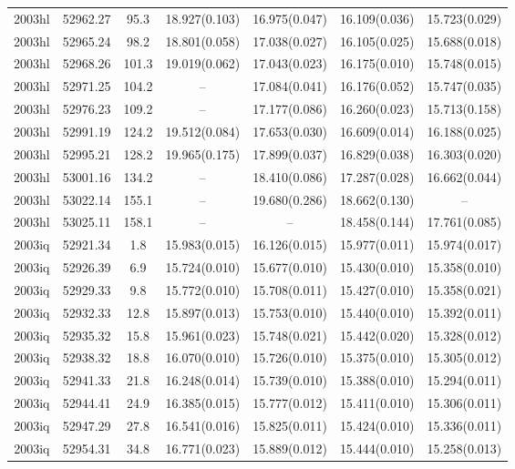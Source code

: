 \begin{table*}
\begin{tabular}{ccccccc}
2003hl	  & 52962.27	 & 95.3	& 18.927(0.103)	 & 16.975(0.047)	 & 16.109(0.036)	 & 15.723(0.029) \\ 
2003hl	  & 52965.24	 & 98.2	& 18.801(0.058)	 & 17.038(0.027)	 & 16.105(0.025)	 & 15.688(0.018) \\ 
2003hl	  & 52968.26	 & 101.3	& 19.019(0.062)	 & 17.043(0.023)	 & 16.175(0.010)	 & 15.748(0.015) \\ 
2003hl	  & 52971.25	 & 104.2	& --	 & 17.084(0.041)	 & 16.176(0.052)	 & 15.747(0.035) \\ 
2003hl	  & 52976.23	 & 109.2	& --	 & 17.177(0.086)	 & 16.260(0.023)	 & 15.713(0.158) \\ 
2003hl	  & 52991.19	 & 124.2	& 19.512(0.084)	 & 17.653(0.030)	 & 16.609(0.014)	 & 16.188(0.025) \\ 
2003hl	  & 52995.21	 & 128.2	& 19.965(0.175)	 & 17.899(0.037)	 & 16.829(0.038)	 & 16.303(0.020) \\ 
2003hl	  & 53001.16	 & 134.2	& --	 & 18.410(0.086)	 & 17.287(0.028)	 & 16.662(0.044) \\ 
2003hl	  & 53022.14	 & 155.1	& --	 & 19.680(0.286)	 & 18.662(0.130)	 & -- \\ 
2003hl	  & 53025.11	 & 158.1	& --	 & --	 & 18.458(0.144)	 & 17.761(0.085) \\ 
2003iq	  & 52921.34	 & 1.8	& 15.983(0.015)	 & 16.126(0.015)	 & 15.977(0.011)	 & 15.974(0.017) \\ 
2003iq	  & 52926.39	 & 6.9	& 15.724(0.010)	 & 15.677(0.010)	 & 15.430(0.010)	 & 15.358(0.010) \\ 
2003iq	  & 52929.33	 & 9.8	& 15.772(0.010)	 & 15.708(0.011)	 & 15.427(0.010)	 & 15.358(0.021) \\ 
2003iq	  & 52932.33	 & 12.8	& 15.897(0.013)	 & 15.753(0.010)	 & 15.440(0.010)	 & 15.392(0.011) \\ 
2003iq	  & 52935.32	 & 15.8	& 15.961(0.023)	 & 15.748(0.021)	 & 15.442(0.020)	 & 15.328(0.012) \\ 
2003iq	  & 52938.32	 & 18.8	& 16.070(0.010)	 & 15.726(0.010)	 & 15.375(0.010)	 & 15.305(0.012) \\ 
2003iq	  & 52941.33	 & 21.8	& 16.248(0.014)	 & 15.739(0.010)	 & 15.388(0.010)	 & 15.294(0.011) \\ 
2003iq	  & 52944.41	 & 24.9	& 16.385(0.015)	 & 15.777(0.012)	 & 15.411(0.010)	 & 15.306(0.011) \\ 
2003iq	  & 52947.29	 & 27.8	& 16.541(0.016)	 & 15.825(0.011)	 & 15.424(0.010)	 & 15.336(0.011) \\ 
2003iq	  & 52954.31	 & 34.8	& 16.771(0.023)	 & 15.889(0.012)	 & 15.444(0.010)	 & 15.258(0.013) \\ 

\end{tabular}
\end{table*}
